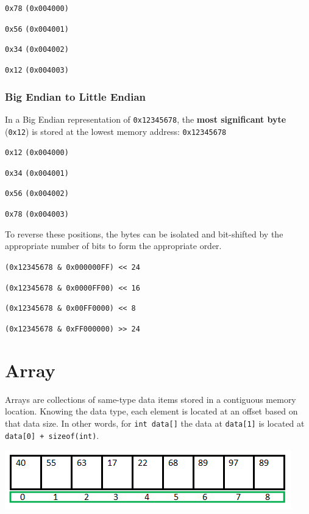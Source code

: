 \documentclass[11pt]{article}
\begin{document}
\begin{list}{}{}
    \item \texttt{0x78} \texttt{(0x004000)}
    \item \texttt{0x56} \texttt{(0x004001)}
    \item \texttt{0x34} \texttt{(0x004002)}
    \item \texttt{0x12} \texttt{(0x004003)}
\end{list}

\subsubsection{Big Endian to Little Endian}

In a Big Endian representation of \texttt{0x12345678}, the \textbf{most significant byte} (\texttt{0x12}) is stored at the lowest memory address: \texttt{0x12345678}

\begin{list}{}{}
    \item \texttt{0x12} \texttt{(0x004000)}
    \item \texttt{0x34} \texttt{(0x004001)}
    \item \texttt{0x56} \texttt{(0x004002)}
    \item \texttt{0x78} \texttt{(0x004003)}
\end{list}

To reverse these positions, the bytes can be isolated and bit-shifted by the appropriate number of bits to form the appropriate order.

\begin{list}{}{}
\item \texttt{(0x12345678 \& 0x000000FF) << 24}
\item \texttt{(0x12345678 \& 0x0000FF00) << 16}
\item \texttt{(0x12345678 \& 0x00FF0000) << 8}
\item \texttt{(0x12345678 \& 0xFF000000) >> 24}
\end{list}

\section{Array}
Arrays are collections of same-type data items stored in a contiguous memory location. Knowing the data type, each element is located at an offset based on that data size. In other words, for \texttt{int data[]} the data at \texttt{data[1]} is located at \texttt{data[0] + sizeof(int)}.
\begin{center}
    \includegraphics[width=250 px]{img/array}  \\
\end{center}
\end{document}
